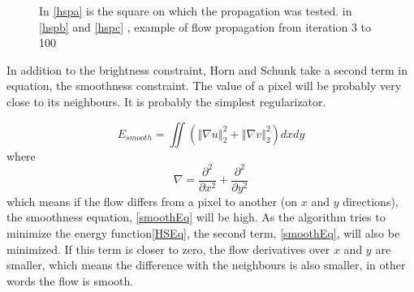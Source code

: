 \documentclass[12pt,a4paper,twoside]{report}
\begin{document}
{\begin{figure} \label{HSExamplep}
	\centering
	\caption{In \ref{hspa} is the square on which the propagation was tested. in \ref{hspb} and \ref{hspc} , example of flow propagation from iteration 3 to 100}
\end{figure}

In addition to the brightness constraint, Horn and Schunk take a second term in equation, the smoothness constraint. The value of a pixel will be probably very close to its neighbours. It is probably the simplest regularizator. 





\begin{equation} \label{smoothEq}
	E_{smooth} = \iint (\left\Vert\nabla u \right\Vert_2^2 +\left\Vert\nabla v \right\Vert_2^2)dxdy
\end{equation}
where
\begin{equation} \label{mynabla}
	\nabla = \frac{\partial^2}{\partial x^2} + \frac{\partial^2}{\partial y^2}
\end{equation}
which means if the flow differs from a pixel to another (on $x$ and $y$ directions), the smoothness equation, \ref{smoothEq} will be high. As the algorithm tries to minimize the energy function\ref{HSEq}, the second term, \ref{smoothEq}, will also be minimized. If this term is closer to zero, the flow derivatives over $x$ and $y$  are smaller, which means the difference with the  neighbours is also smaller, in other words the flow is smooth.

}
\end{document}
